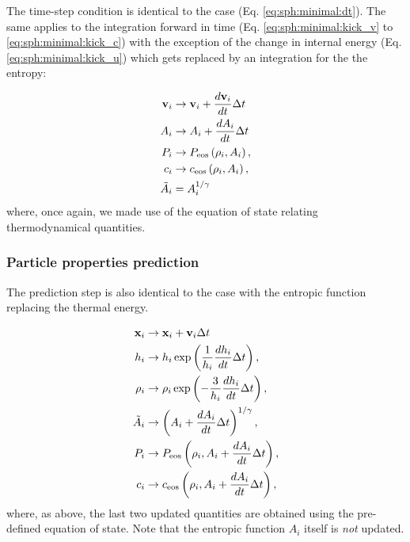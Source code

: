 The time-step condition is identical to the \MinimalSPH case
(Eq. \ref{eq:sph:minimal:dt}). The same applies to the integration
forward in time (Eq. \ref{eq:sph:minimal:kick_v} to
\ref{eq:sph:minimal:kick_c}) with the exception of the change in
internal energy (Eq. \ref{eq:sph:minimal:kick_u}) which gets replaced
by an integration for the the entropy:

\begin{align}
  \vec{v}_i &\rightarrow \vec{v}_i + \frac{d\vec{v}_i}{dt} \Delta t  \label{eq:sph:pe:kick_v}\\
  A_i &\rightarrow A_i + \frac{dA_i}{dt} \Delta t \label{eq:sph:pe:kick_A}\\
  P_i &\rightarrow P_{\rm eos}\left(\rho_i, A_i\right) \label{eq:sph:pe:kick_P}, \\
  c_i &\rightarrow c_{\rm eos}\left(\rho_i,
  A_i\right) \label{eq:sph:pe:kick_c}, \\
  \tilde A_i &= A_i^{1/\gamma}
\end{align}
where, once again, we made use of the equation of state relating
thermodynamical quantities.


\subsubsection{Particle properties prediction}

The prediction step is also identical to the \MinimalSPH case with the
entropic function replacing the thermal energy.

\begin{align}
  \vec{x}_i &\rightarrow \vec{x}_i + \vec{v}_i \Delta t  \label{eq:sph:pe:drift_x} \\
  h_i &\rightarrow h_i \exp\left(\frac{1}{h_i} \frac{dh_i}{dt}
  \Delta t\right), \label{eq:sph:pe:drift_h}\\
  \rho_i &\rightarrow \rho_i \exp\left(-\frac{3}{h_i} \frac{dh_i}{dt}
  \Delta t\right), \label{eq:sph:pe:drift_rho} \\
  \tilde A_i &\rightarrow \left(A_i + \frac{dA_i}{dt}
  \Delta t\right)^{1/\gamma} \label{eq:sph:pe:drift_A_tilde}, \\
  P_i &\rightarrow P_{\rm eos}\left(\rho_i, A_i + \frac{dA_i}{dt} \Delta t\right), \label{eq:sph:pe:drift_P}\\
  c_i &\rightarrow c_{\rm eos}\left(\rho_i, A_i + \frac{dA_i}{dt}
  \Delta t\right) \label{eq:sph:pe:drift_c}, 
\end{align}
where, as above, the last two updated quantities are obtained using
the pre-defined equation of state. Note that the entropic function $A_i$
itself is \emph{not} updated.

